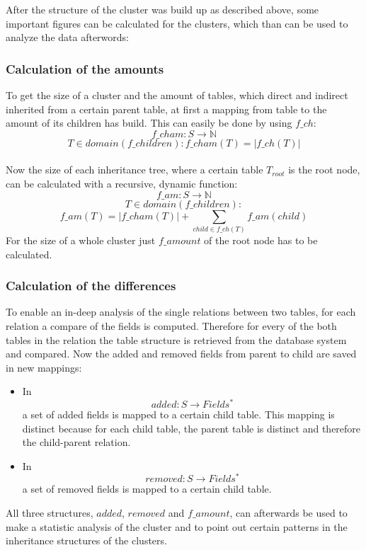 \documentclass[10pt, journal, twocolumn]{IEEEtran}
\begin{document}
After the structure of the cluster was build up as described above, some important figures can be calculated for the clusters, which than can be used to analyze the data afterwords:
\\\subsubsection{Calculation of the amounts}
To get the size of a cluster and the amount of tables, which direct and indirect inherited from a certain parent table, at first a mapping from table to the amount of its children has build. This can easily be done by using $f\_ch$: $$ f\_cham: S \rightarrow \mathbb{N} $$ $$T \in domain(f\_children): f\_cham(T) = | f\_ch(T) | $$\\
Now the size of each inheritance tree, where a certain table $T_{root}$ is the root node, can be calculated with a recursive, dynamic function:
$$ f\_am: S \rightarrow \mathbb{N} $$
$$ T \in domain(f\_children): $$ $$f\_am(T) = | f\_cham(T) | + \sum_{child \in f\_ch(T)}{f\_am(child)} $$
For the size of a whole cluster just $f\_amount$ of the root node has to be calculated.
\\\subsubsection{Calculation of the differences}
To enable an in-deep analysis of the single relations between two tables, for each relation a compare of the fields is computed. Therefore for every of the both tables in the relation the table structure is retrieved from the database system and compared. Now the added and removed fields from parent to child are saved in new mappings:
\begin{itemize}
\item In $$added: S \rightarrow Fields^*$$ a set of added fields is mapped to a certain child table. This mapping is distinct because for each child table, the parent table is distinct and therefore the child-parent relation.
\item In $$removed: S \rightarrow Fields^*$$ a set of removed fields is mapped to a certain child table. 
\end{itemize}
All three structures, $added$, $removed$ and $f\_amount$, can afterwards be used to make a statistic analysis of the cluster and to point out certain patterns in the inheritance structures of the clusters.
\end{document}
